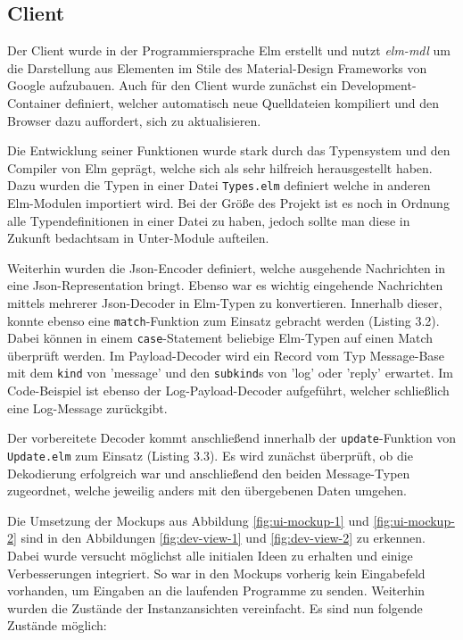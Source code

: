 \subsection{Client}
Der Client wurde in der Programmiersprache Elm erstellt und nutzt \textit{elm-mdl} um die Darstellung aus Elementen im Stile des Material-Design Frameworks von Google aufzubauen.
Auch für den Client wurde zunächst ein Development-Container definiert, welcher automatisch neue Quelldateien kompiliert und den Browser dazu auffordert, sich zu aktualisieren.
\par
Die Entwicklung seiner Funktionen wurde stark durch das Typensystem und den Compiler von Elm geprägt, welche sich als sehr hilfreich herausgestellt haben.
Dazu wurden die Typen in einer Datei \texttt{Types.elm} definiert welche in anderen Elm-Modulen importiert wird.
Bei der Größe des Projekt ist es noch in Ordnung alle Typendefinitionen in einer Datei zu haben, jedoch sollte man diese in Zukunft bedachtsam in Unter-Module aufteilen.
\par
Weiterhin wurden die Json-Encoder definiert, welche ausgehende Nachrichten in eine Json-Representation bringt.
Ebenso war es wichtig eingehende Nachrichten mittels mehrerer Json-Decoder in Elm-Typen zu konvertieren.
Innerhalb dieser, konnte ebenso eine \texttt{match}-Funktion zum Einsatz gebracht werden (Listing 3.2).
Dabei können in einem \texttt{case}-Statement beliebige Elm-Typen auf einen Match überprüft werden.
Im Payload-Decoder wird ein Record vom Typ Message-Base mit dem \texttt{kind} von 'message' und den \texttt{subkind}s von 'log' oder 'reply' erwartet.
Im Code-Beispiel ist ebenso der Log-Payload-Decoder aufgeführt, welcher schließlich eine Log-Message zurückgibt.
\par Der vorbereitete Decoder kommt anschließend innerhalb der \texttt{update}-Funktion von \texttt{Update.elm} zum Einsatz (Listing 3.3).
Es wird zunächst überprüft, ob die Dekodierung erfolgreich war und anschließend den beiden Message-Typen zugeordnet, welche jeweilig anders mit den übergebenen Daten umgehen.
\par Die Umsetzung der Mockups aus Abbildung \ref{fig:ui-mockup-1} und \ref{fig:ui-mockup-2} sind in den Abbildungen \ref{fig:dev-view-1} und \ref{fig:dev-view-2} zu erkennen.
Dabei wurde versucht möglichst alle initialen Ideen zu erhalten und einige Verbesserungen integriert.
So war in den Mockups vorherig kein Eingabefeld vorhanden, um Eingaben an die laufenden Programme zu senden.
Weiterhin wurden die Zustände der Instanzansichten vereinfacht. Es sind nun folgende Zustände möglich:
